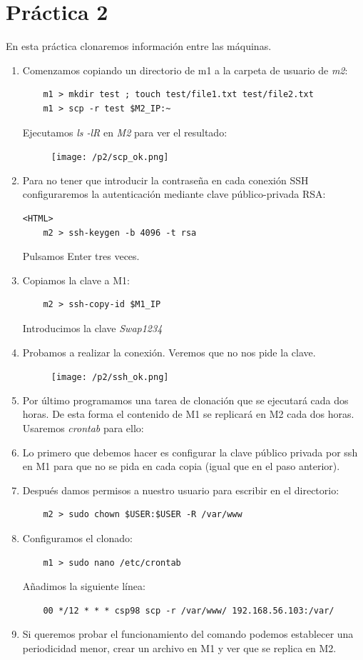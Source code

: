 \documentclass[12pt,spanish]{article}
\begin{document}
\section{Práctica 2}

En esta práctica clonaremos información entre las máquinas.

\begin{enumerate}
	\item Comenzamos copiando un directorio de m1 a la carpeta de usuario de \emph{m2}:
	\begin{lstlisting}
	m1 > mkdir test ; touch test/file1.txt test/file2.txt
	m1 > scp -r test $M2_IP:~
	\end{lstlisting}
	Ejecutamos \emph{ls -lR} en \emph{M2} para ver el resultado:
	\begin{figure}[H]
		\centering
		\texttt{[image: /p2/scp\_ok.png]}
	\end{figure}
	\item Para no tener que introducir la contraseña en cada conexión SSH configuraremos la autenticación mediante clave público-privada RSA:
	\begin{lstlisting}<HTML>
	m2 > ssh-keygen -b 4096 -t rsa
	\end{lstlisting}
	Pulsamos Enter tres veces.
	\item Copiamos la clave a M1:
	\begin{lstlisting}
	m2 > ssh-copy-id $M1_IP
	\end{lstlisting}
	Introducimos la clave \emph{Swap1234}
	\item Probamos a realizar la conexión. Veremos que no nos pide la clave.
	\begin{figure}[H]
		\centering
		\texttt{[image: /p2/ssh\_ok.png]}
	\end{figure}
	\item Por último programamos una tarea de clonación que se ejecutará cada dos horas. De esta forma el contenido de M1 se replicará en M2 cada dos horas. Usaremos \emph{crontab} para ello:
	\item Lo primero que debemos hacer es configurar la clave público privada por ssh en M1 para que no se pida en cada copia (igual que en el paso anterior).
	\item Después damos permisos a nuestro usuario para escribir en el directorio:
	\begin{lstlisting}
	m2 > sudo chown $USER:$USER -R /var/www
	\end{lstlisting}
	\item Configuramos el clonado:
	\begin{lstlisting}
	m1 > sudo nano /etc/crontab
	\end{lstlisting}
	Añadimos la siguiente línea:
	\begin{lstlisting}
	00 */12 * * * csp98 scp -r /var/www/ 192.168.56.103:/var/
	\end{lstlisting}
	\item Si queremos probar el funcionamiento del comando podemos establecer una periodicidad menor, crear un archivo en M1 y ver que se replica en M2.
\end{enumerate}
\end{document}
